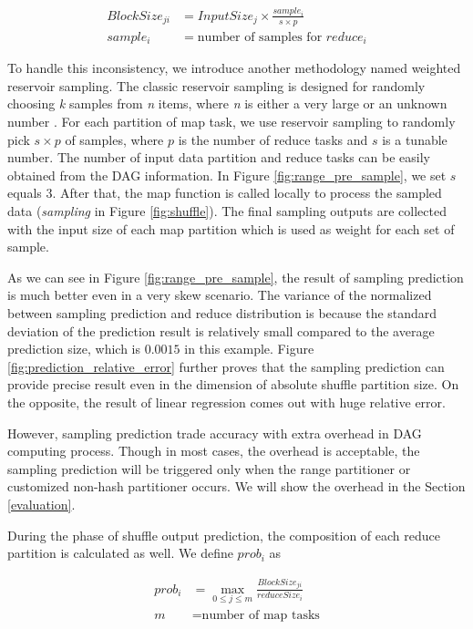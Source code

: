 \begin{equation}
\label{equationsample}
\begin{aligned}
	BlockSize_{ji} &= {{InputSize_j \times \frac{sample_i}{s \times p}}} \\
	sample_i &= \text{number of samples for $reduce_i$}
\end{aligned}
\end{equation}

To handle this inconsistency, we introduce another methodology named weighted reservoir sampling. The classic reservoir sampling is designed for randomly choosing \textit{k} samples from \textit{n} items, where \textit{n} is either a very large or an unknown number \cite{reservoir}. For each partition of map task, we use reservoir sampling to randomly pick $s \times p$ of samples, where $p$ is the number of reduce tasks and $s$ is a tunable number. The number of input data partition and reduce tasks can be easily obtained from the DAG information. In Figure \ref{fig:range_pre_sample}, we set $s$ equals $3$. After that, the map function is called locally to process the sampled data (\textit{sampling} in Figure \ref{fig:shuffle}). The final sampling outputs are collected with the input size of each map partition which is used as weight for each set of sample.

As we can see in Figure \ref{fig:range_pre_sample}, the result of sampling prediction is much better even in a very skew scenario. The variance of the normalized between sampling prediction and reduce distribution is because the standard deviation of the prediction result is relatively small compared to the average prediction size, which is $0.0015$ in this example. Figure \ref{fig:prediction_relative_error} further proves that the sampling prediction can provide precise result even in the dimension of absolute shuffle partition size. On the opposite, the result of linear regression comes out with huge relative error.

However, sampling prediction trade accuracy with extra overhead in DAG computing process. Though in most cases, the overhead is acceptable, the sampling prediction will be triggered only when the range partitioner or customized non-hash partitioner occurs. We will show the overhead in the Section \ref{evaluation}.

During the phase of shuffle output prediction, the composition of each reduce partition is calculated as well. We define $prob_i$ as

\begin{equation}
\label{equationsample}
\begin{aligned}
	prob_i &= \max_{0 \leq j \leq m} \frac{BlockSize_{ji}}{reduceSize_i} \\
    m &= \text{number of map tasks}
\end{aligned}
\end{equation}

